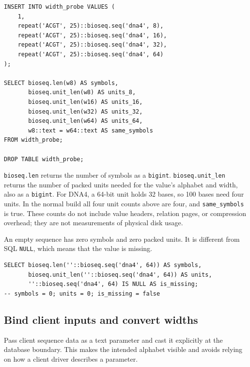 \par\noindent\begin{minipage}{\linewidth}
\begin{lstlisting}[style=bioseq-appendix-sql]
INSERT INTO width_probe VALUES (
    1,
    repeat('ACGT', 25)::bioseq.seq('dna4', 8),
    repeat('ACGT', 25)::bioseq.seq('dna4', 16),
    repeat('ACGT', 25)::bioseq.seq('dna4', 32),
    repeat('ACGT', 25)::bioseq.seq('dna4', 64)
);

SELECT bioseq.len(w8) AS symbols,
       bioseq.unit_len(w8) AS units_8,
       bioseq.unit_len(w16) AS units_16,
       bioseq.unit_len(w32) AS units_32,
       bioseq.unit_len(w64) AS units_64,
       w8::text = w64::text AS same_symbols
FROM width_probe;

DROP TABLE width_probe;
\end{lstlisting}
\end{minipage}

\texttt{bioseq.len} returns the number of symbols as a \texttt{bigint}.
\texttt{bioseq.unit\_len} returns the number of packed units needed for the
value's alphabet and width, also as a \texttt{bigint}. For DNA4, a 64-bit unit
holds 32 bases, so 100 bases need four units. In the normal build all four
unit counts above are four, and \texttt{same\_symbols} is true. These counts
do not include value headers, relation pages, or compression overhead; they
are not measurements of physical disk usage.

An empty sequence has zero symbols and zero packed units. It is different
from SQL \texttt{NULL}, which means that the value is missing.

\par\noindent\begin{minipage}{\linewidth}
\begin{lstlisting}[style=bioseq-appendix-sql]
SELECT bioseq.len(''::bioseq.seq('dna4', 64)) AS symbols,
       bioseq.unit_len(''::bioseq.seq('dna4', 64)) AS units,
       ''::bioseq.seq('dna4', 64) IS NULL AS is_missing;
-- symbols = 0; units = 0; is_missing = false
\end{lstlisting}
\end{minipage}

\subsection{Bind client inputs and convert widths}

Pass client sequence data as a text parameter and cast it explicitly at the
database boundary. This makes the intended alphabet visible and avoids
relying on how a client driver describes a parameter.


